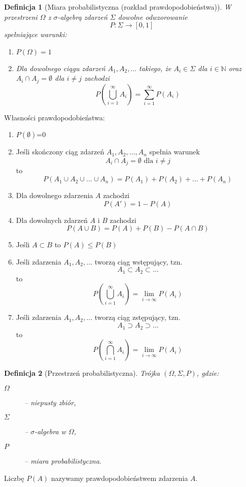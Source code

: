 \documentclass[11pt, leqno]{scrartcl}
\theoremstyle{mydefinition}
\newtheorem{definition}{Definicja}[subsection]
\theoremstyle{mytheorem}
\begin{document}
    \begin{definition}[Miara probabilistyczna (rozkład
        prawdopodobieństwa)]
        W przestrzeni $\Omega$ z $\sigma$-algebrą zdarzeń $\Sigma$
        dowolne odwzorowanie
        \[
            P:\Sigma \to [0,1]
        \]
        spełniające warunki:
        \begin{enumerate}
            \item $P(\Omega)=1$
            \item Dla dowolnego ciągu zdarzeń $A_1,A_2,\ldots$ takiego,
                że $A_i \in \Sigma$ dla $i \in \mathbb{N}$ oraz
                $A_i \cap A_j=\emptyset$ dla $i \neq j$ zachodzi
                \[
                    P\left(\bigcup_{i=1}^{\infty}A_i\right)=
                    \sum_{i=1}^{\infty}P(A_i)
                \]
        \end{enumerate}
    \end{definition}
    Własności prawdopodobieństwa:
    \begin{enumerate}
        \item $P(\emptyset)$=0
        \item Jeśli skończony ciąg zdarzeń $A_1,A_2,\ldots,A_n$ spełnia
            warunek
            \[
                A_i \cap A_j = \emptyset \text{ dla }i \neq j
            \]
            to
            \[
                P(A_1 \cup A_2 \cup \ldots \cup A_n)=
                P(A_1)+P(A_2)+\ldots +P(A_n)
            \]
        \item Dla dowolnego zdarzenia $A$ zachodzi
            \[
                P(A')=1-P(A)
            \]
        \item Dla dowolnych zdarzeń $A$ i $B$ zachodzi
            \[
                P(A \cup B)=P(A)+P(B)-P(A \cap B)
            \]
        \item Jeśli $A \subset B$ to $P(A)\leq P(B)$
        \item Jeśli zdarzenia $A_1,A_2,\ldots$ tworzą ciąg
            wstępujący, tzn.
            \[
                A_1 \subset A_2 \subset \ldots
            \]
            to
            \[
                P\left( \bigcup_{i=1}^{\infty}A_i \right)=
                \lim_{i \to \infty}P(A_i)
            \]
        \item Jeśli zdarzenia $A_1,A_2,\ldots$ tworzą ciąg
            zstępujący, tzn.
            \[
                A_1 \supset A_2 \supset \ldots
            \]
            to
            \[
                P\left( \bigcap_{i=1}^{\infty}A_i \right)=
                \lim_{i \to \infty}P(A_i)
            \]
    \end{enumerate}
    \begin{definition}[Przestrzeń probabilistyczna]
        Trójka $(\Omega,\Sigma,P)$, gdzie:
        \begin{description}
            \item[$\Omega$] -- niepusty zbiór,
            \item[$\Sigma$] -- $\sigma$-algebra w $\Omega$,
            \item[$P$] -- miara probabilistyczna.
        \end{description}
    \end{definition}
    Liczbę $P(A)$ nazywamy prawdopodobieństwem zdarzenia $A$.
\end{document}
